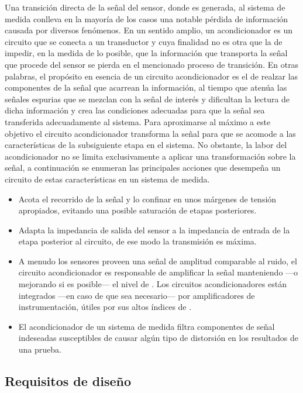 Una transición directa de la señal del sensor, donde es generada, al
sistema de medida conlleva en la mayoría de los casos una notable pérdida
de información causada por diversos fenómenos. En un sentido amplio, un
acondicionador es un circuito que se conecta a un transductor y cuya
finalidad no es otra que la de impedir, en la medida de lo posible, que la
información que transporta la señal que procede del sensor se pierda en el
mencionado proceso de transición. En otras palabras, el propósito en
esencia de un circuito acondicionador es el de realzar las componentes de
la señal que acarrean la información, al tiempo que atenúa las señales
espurias que se mezclan con la señal de interés y dificultan la lectura de
dicha información y crea las condiciones adecuadas para que la señal sea
transferida adecuadamente al sistema. Para aproximarse al máximo a este
objetivo el circuito acondicionador transforma la señal para que se acomode
a las características de la subsiguiente etapa en el sistema. No obstante,
la labor del acondicionador no se limita exclusivamente a aplicar una
transformación sobre la señal, a continuación se enumeran las principales
acciones que desempeña un circuito de estas características en un sistema
de medida.

\begin{itemize}
	\item Acota el recorrido de la señal y lo confinar en unos márgenes
		de tensión apropiados, evitando una posible saturación de
		etapas posteriores.
	\item Adapta la impedancia de salida del sensor a la impedancia de
		entrada de la etapa posterior al circuito, de ese modo la
		transmisión es máxima.
	\item A menudo los sensores proveen una señal de amplitud
		comparable al ruido, el circuito acondicionador es
		responsable de amplificar la señal manteniendo ---o
		mejorando si es posible--- el nivel de . Los
		circuitos acondicionadores están integrados ---en caso de
		que sea necesario--- por amplificadores de instrumentación,
		útiles por sus altos índices de .
	\item El acondicionador de un sistema de medida filtra componentes
		de señal indeseadas susceptibles de causar algún tipo de
		distorsión en los resultados de una prueba.
\end{itemize}


\subsection{Requisitos de diseño} %


